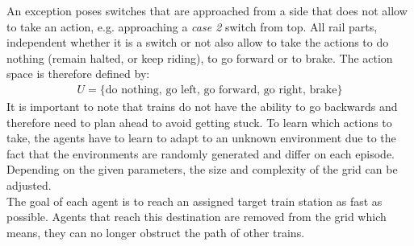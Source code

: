 An exception poses switches that are approached from a side that does not allow to take an action, e.g. approaching a \textit{case 2} switch from top.
All rail parts, independent whether it is a switch or not also allow to take the actions to do nothing (remain halted, or keep riding), to go forward or to brake.
The action space is therefore defined by:
\begin{gather*}
U = \{ \text{do nothing, go left, go forward, go right, brake} \}
\end{gather*}
It is important to note that trains do not have the ability to go backwards and therefore need to plan ahead to avoid getting stuck. To learn which actions to take, the agents have to learn to adapt to an unknown environment due to the fact that the environments are randomly generated and differ on each episode. Depending on the given parameters, the size and complexity of the grid can be adjusted.\\
The goal of each agent is to reach an assigned target train station as fast as possible. Agents that reach this destination are removed from the grid which means, they can no longer obstruct the path of other trains.


